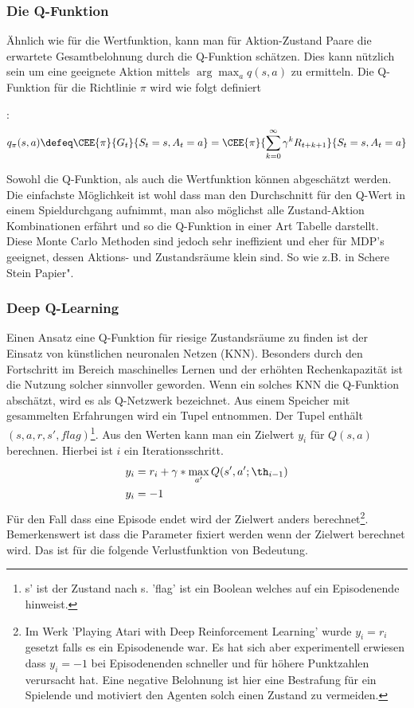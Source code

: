 \documentclass[a4paper,titlepage]{article}
\numberwithin{equation}{section} %
\begin{document}
\subsubsection{Die Q-Funktion} \label{section:q-funktion}
Ähnlich wie für die Wertfunktion, kann man für Aktion-Zustand Paare die erwartete Gesamtbelohnung durch die Q-Funktion schätzen. Dies kann nützlich sein um eine geeignete Aktion mittels $\arg\max_{a}q(s,a)$ zu ermitteln. Die Q-Funktion für die Richtlinie $\pi$ wird wie folgt definiert{\cite{watkinsQlearning1992}:
\begin{equation} \label{eqn:q_definition}
	q_\pi(s,a) \defeq \CEE{\pi}{G_t}{S_t=s, A_t=a} = \CEE{\pi}{\sum_{k=0}^{\infty}\gamma^{k}R_{t+k+1}}{S_t=s, A_t=a}
\end{equation}

Sowohl die Q-Funktion, als auch die Wertfunktion können abgeschätzt werden. Die einfachste Möglichkeit ist wohl dass man den Durchschnitt für den Q-Wert in einem Spieldurchgang aufnimmt, man also möglichst alle Zustand-Aktion Kombinationen erfährt und so die Q-Funktion in einer Art Tabelle darstellt. Diese Monte Carlo Methoden sind jedoch sehr ineffizient und eher für MDP's geeignet, dessen Aktions- und Zustandsräume klein sind. So wie z.B. in Schere Stein Papier"\cite{Wang2020}.


\subsubsection{Deep Q-Learning}
Einen Ansatz eine Q-Funktion für riesige Zustandsräume zu finden ist der Einsatz von künstlichen neuronalen Netzen (KNN). Besonders durch den Fortschritt im Bereich maschinelles Lernen und der erhöhten Rechenkapazität ist die Nutzung solcher sinnvoller geworden. Wenn ein solches KNN die Q-Funktion abschätzt, wird es als Q-Netzwerk bezeichnet\cite{mnihHumanlevelControlDeep2015b}.
Aus einem Speicher mit gesammelten Erfahrungen wird ein Tupel entnommen. Der Tupel enthält $(s, a, r, s', flag)$\footnote{s' ist der Zustand nach s. 'flag' ist ein Boolean welches auf ein Episodenende hinweist.}. Aus den Werten kann man ein Zielwert $y_i$ für $Q(s,a)$ berechnen. Hierbei ist $i$ ein Iterationsschritt.
\begin{align}
	y_i &= r_i + \gamma * \max_{a'}Q(s', a'; \th_{i-1}) \\
	y_i &= -1 \nonumber
\end{align}
Für den Fall dass eine Episode endet wird der Zielwert anders berechnet\footnote{Im Werk 'Playing Atari with Deep Reinforcement Learning'\cite{mnihHumanlevelControlDeep2015b} wurde $y_i = r_i$ gesetzt falls es ein Episodenende war. Es hat sich aber experimentell erwiesen dass $y_i=-1$ bei Episodenenden schneller und für höhere Punktzahlen verursacht hat. Eine negative Belohnung ist hier eine Bestrafung für ein Spielende und motiviert den Agenten solch einen Zustand zu vermeiden.}. Bemerkenswert ist dass die Parameter fixiert werden wenn der Zielwert berechnet wird. Das ist für die folgende Verlustfunktion von Bedeutung.

}
\end{document}
